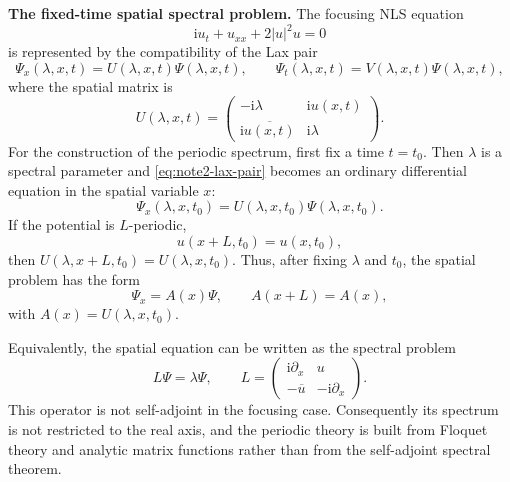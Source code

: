 \documentclass{amsart}
\newcounter{note}
\numberwithin{equation}{hw}
\newcommand{\noteheading}[1]{\vspace{1em}\noindent\textbf{#1}}
\begin{document}
\noteheading{The fixed-time spatial spectral problem.}
The focusing NLS equation
\begin{equation}
\mathrm{i}u_t+u_{xx}+2|u|^2u=0
\label{eq:note2-nls}
\end{equation}
is represented by the compatibility of the Lax pair
\begin{equation}
\Psi_x(\lambda,x,t)=U(\lambda,x,t)\Psi(\lambda,x,t),
\qquad
\Psi_t(\lambda,x,t)=V(\lambda,x,t)\Psi(\lambda,x,t),
\label{eq:note2-lax-pair}
\end{equation}
where the spatial matrix is
\begin{equation}
U(\lambda,x,t)
=
\begin{pmatrix}
-\mathrm{i}\lambda & \mathrm{i}u(x,t)
\\
\mathrm{i}\overline{u(x,t)} & \mathrm{i}\lambda
\end{pmatrix}.
\label{eq:note2-U}
\end{equation}
For the construction of the periodic spectrum, first fix a time
\(t=t_0\).  Then \(\lambda\) is a spectral parameter and
\eqref{eq:note2-lax-pair} becomes an ordinary differential equation in
the spatial variable \(x\):
\begin{equation}
\Psi_x(\lambda,x,t_0)
=
U(\lambda,x,t_0)\Psi(\lambda,x,t_0).
\label{eq:note2-spatial-ode}
\end{equation}
If the potential is \(L\)-periodic,
\begin{equation}
u(x+L,t_0)=u(x,t_0),
\label{eq:note2-periodic-potential}
\end{equation}
then \(U(\lambda,x+L,t_0)=U(\lambda,x,t_0)\).  Thus, after fixing
\(\lambda\) and \(t_0\), the spatial problem has the form
\begin{equation}
\Psi_x=A(x)\Psi,
\qquad
A(x+L)=A(x),
\label{eq:note2-periodic-ode}
\end{equation}
with \(A(x)=U(\lambda,x,t_0)\).

Equivalently, the spatial equation can be written as the spectral
problem
\begin{equation}
L\Psi=\lambda\Psi,
\qquad
L=
\begin{pmatrix}
\mathrm{i}\partial_x & u
\\
-\overline{u} & -\mathrm{i}\partial_x
\end{pmatrix}.
\label{eq:note2-L-operator}
\end{equation}
This operator is not self-adjoint in the focusing case.  Consequently
its spectrum is not restricted to the real axis, and the periodic theory
is built from Floquet theory and analytic matrix functions rather than
from the self-adjoint spectral theorem.
\end{document}

